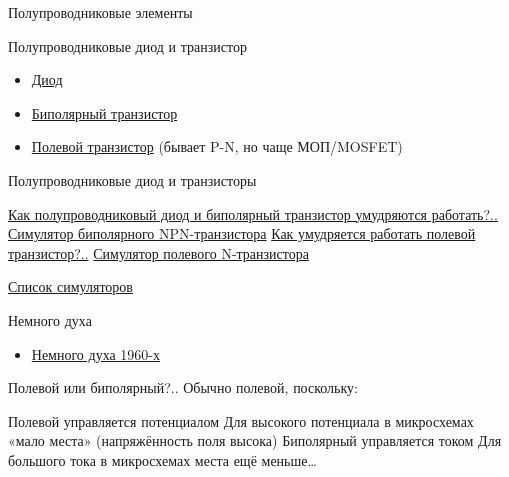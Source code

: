 \documentclass[xetex,aspectratio=43]{beamer}
\begin{document}
\begin{frame}{Полупроводниковые элементы}

\begin{block}{Полупроводниковые диод и транзистор}
\begin{itemize}
\item
  \href{https://en.wikipedia.org/wiki/Diode}{Диод}
\item
  \href{https://en.wikipedia.org/wiki/Bipolar_junction_transistor}{Биполярный
  транзистор}
\item \href{https://en.wikipedia.org/wiki/Field-effect_transistor}{Полевой транзистор} (бывает P-N, но чаще МОП/MOSFET)
\end{itemize}
\end{block}

\pause

\begin{block}{Полупроводниковые диод и транзисторы}
    \begin{outline}[itemize]
        \1 \href{https://youtu.be/OMGdSCaMVD0?t=107}{Как полупроводниковый диод и биполярный транзистор умудряются работать?..}
            \2 \href{https://www.falstad.com/circuit/e-npn.html}{Симулятор биполярного NPN-транзистора}
        \1 \href{https://youtu.be/ZUly6Wz0RHc}{Как умудряется работать полевой транзистор?..}
            \2 \href{https://www.falstad.com/circuit/e-nmosfet.html}{Симулятор полевого N-транзистора}
    \end{outline}
    \pause
    \href{https://www.falstad.com/circuit/e-index.html}{Список симуляторов}
\end{block}

\pause

\begin{block}{Немного духа}
    \begin{itemize}
        \item \href{https://youtu.be/DEewNHWgqFU}{Немного духа 1960-х}
    \end{itemize}
\end{block}
\end{frame}

\begin{frame}{Полевой или биполярный?..}
    Обычно полевой, поскольку:
    \begin{outline}[itemize]
        \1 Полевой управляется потенциалом
            \2 Для высокого потенциала в микросхемах «мало места» (напряжённость поля высока)
        \pause
        \1 Биполярный управляется током
            \2 Для большого тока в микросхемах места ещё меньше\ldots
    \end{outline}
\end{frame}
\end{document}
